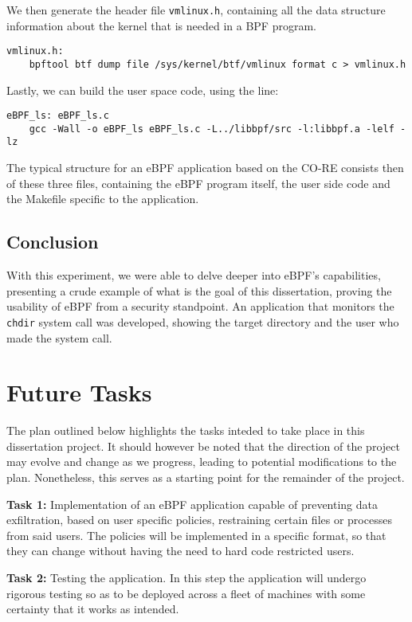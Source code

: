 We then generate the header file \texttt{vmlinux.h}, containing all the data structure information about the kernel that is needed in a BPF program. 

\begin{lstlisting}
vmlinux.h:
	bpftool btf dump file /sys/kernel/btf/vmlinux format c > vmlinux.h
\end{lstlisting}

Lastly, we can build the user space code, using the line: 
\begin{lstlisting}
eBPF_ls: eBPF_ls.c
	gcc -Wall -o eBPF_ls eBPF_ls.c -L../libbpf/src -l:libbpf.a -lelf -lz
\end{lstlisting}

The typical structure for an eBPF application based on the CO-RE consists then of these three files, containing the eBPF program itself, the user side code and the Makefile specific to the application.

\subsection{Conclusion}
With this experiment, we were able to delve deeper into eBPF's capabilities, presenting a crude example of what is the goal of this dissertation, proving the usability of eBPF from a security standpoint. An application that monitors the \texttt{chdir} system call was developed, showing the target directory and the user who made the system call. 

\section{Future Tasks}
The plan outlined below highlights the tasks inteded to take place in this dissertation project. It should however be noted that the direction of the project may evolve and change as we progress, leading to potential modifications to the plan. Nonetheless, this serves as a starting point for the remainder of the project. 

\textbf{Task 1:} Implementation of an eBPF application capable of preventing data exfiltration, based on user specific policies, restraining certain files or processes from said users. The policies will be implemented in a specific format, so that they can change without having the need to hard code restricted users. 

\textbf{Task 2:} Testing the application. In this step the application will undergo rigorous testing so as to be deployed across a fleet of machines with some certainty that it works as intended.

